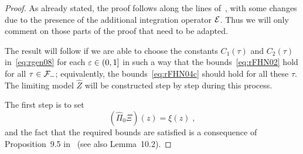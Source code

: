 \documentclass[reqno,11pt]{article}
\def\Zhat{\widehat Z}
\def\Pihat{\widehat\Pi}
\begin{document}
\begin{proof}
As already stated, the proof follows along the lines
of~\cite[Thm.~10.22]{Hairer2014}, with some changes due to the presence of the
additional integration operator ${\mathcal E}$. Thus we will only comment on those parts
of the proof that need to be adapted. 

The result will follow if we are able to choose the constants $C_1(\tau)$ and
$C_2(\tau)$ in~\eqref{eq:rgen08} for each $\varepsilon\in(0,1]$ in such a way that the
bounds~\eqref{eq:rFHN02} hold for all $\tau\in{\mathcal F}_-$; equivalently, the
bounds~\eqref{eq:rFHN04c} should hold for all these $\tau$. The limiting model
$\Zhat$ will be constructed step by step during this process.

The first step is to set 
\[
 (\Pihat_0\Xi)(z) = \xi(z)\;,
\]
and the fact that the required bounds are satisfied is a consequence of
Proposition~9.5 in~\cite{Hairer2014} (see also Lemma~10.2). 


\end{proof}
\end{document}

